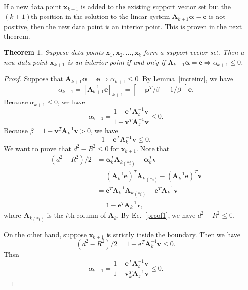 \documentclass{article}
\newcommand{\eref}[1]{Eq.~\ref{#1}}
\newcommand{\lref}[1]{Lemma~\ref{#1}}
\newtheorem{theorem}{Theorem}
\numberwithin{equation}{section}
\begin{document}
If a new data point $\mathbf{x}_{k+1}$ is added to the existing support vector set but the $(k+1)$th position in the solution to the linear system $\mathbf{A}_{k+1}\boldsymbol{\alpha}= \mathbf{e}$ is not positive, then the new data point is an interior point. This is proven in the next theorem.

\begin{theorem}\label{notallsv}
Suppose data points $\mathbf{x}_1,\mathbf{x}_2,\ldots,\mathbf{x}_k$ form a support vector set. Then a new data point $\mathbf{x}_{k+1}$ is an interior point if and only if $\mathbf{A}_{k+1}\boldsymbol{\alpha}=\mathbf{e}\Rightarrow\alpha_{k+1}\le0$. 
\end{theorem}
\begin{proof}
Suppose that $\mathbf{A}_{k+1}\boldsymbol{\alpha}=\mathbf{e}\Rightarrow\alpha_{k+1}\le0$. By \lref{increinv}, we have 
\begin{equation}
\alpha_{k+1} = [\mathbf{A}_{k+1}^{-1}\mathbf{e}]_{k+1}
=\begin{bmatrix}
-\mathbf{p}^T/\beta && 1/\beta
\end{bmatrix}\mathbf{e}.
\end{equation}
Because $\alpha_{k+1}\le0$, we have
\begin{equation}\label{alphak+1}
\alpha_{k+1} = \frac{1-\mathbf{e}^T\mathbf{A}_k^{-1}\mathbf{v}}{1-\mathbf{v}^T\mathbf{A}_k^{-1}\mathbf{v}}\le0. 
\end{equation}
Because $\beta = 1-\mathbf{v}^T\mathbf{A}_k^{-1}\mathbf{v} > 0$, we have 
\begin{equation}\label{proof1}
1-\mathbf{e}^T\mathbf{A}_k^{-1}\mathbf{v}\le0.
\end{equation} 
We want to prove that $d^2-R^2\le0$ for $\mathbf{x}_{k+1}$. Note that
\begin{equation}\label{dist2-r2}
\begin{split}
(d^2-R^2)/2 &= \boldsymbol{\alpha}_k^T{\mathbf{A}_k}_{(*i)} - \boldsymbol{\alpha}_k^T\mathbf{v} \\
&= (\mathbf{A}_k^{-1}\mathbf{e})^T{\mathbf{A}_k}_{(*i)} - (\mathbf{A}_k^{-1}\mathbf{e})^T\mathbf{v}\\
&=\mathbf{e}^T\mathbf{A}_k^{-1}{\mathbf{A}_k}_{(*i)} - \mathbf{e}^T\mathbf{A}_k^{-1}\mathbf{v} \\
&=1-\mathbf{e}^T\mathbf{A}_k^{-1}\mathbf{v},
\end{split}
\end{equation}
where ${\mathbf{A}_{k}}_{(*i)}$ is the $i$th column of ${\mathbf{A}_{k}}$. By \eref{proof1}, we have $d^2-R^2\le0$.

On the other hand, suppose $\mathbf{x}_{k+1}$ is strictly inside the boundary. Then we have 
\begin{equation}
(d^2-R^2)/2 = 1-\mathbf{e}^T\mathbf{A}_k^{-1}\mathbf{v} \le 0.
\end{equation}
Then
\begin{equation}
\alpha_{k+1} = \frac{1-\mathbf{e}^T\mathbf{A}_k^{-1}\mathbf{v}}{1-\mathbf{v}_k^T\mathbf{A}_k^{-1}\mathbf{v}}\le0. 
\end{equation}
\end{proof}
\end{document}
